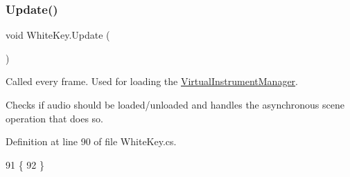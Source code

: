 \mbox{\label{group___white_key_unity_ga160cb397de3ab7084247e7fede943cf7}} 
\subsubsection{\texorpdfstring{Update()}{Update()}}
{\footnotesize\ttfamily void White\+Key.\+Update (\begin{DoxyParamCaption}{ }\end{DoxyParamCaption})\hspace{0.3cm}{\ttfamily [private]}}



Called every frame. Used for loading the \hyperlink{class_virtual_instrument_manager}{Virtual\+Instrument\+Manager}. 

Checks if audio should be loaded/unloaded and handles the asynchronous scene operation that does so. 

Definition at line 90 of file White\+Key.\+cs.


\begin{DoxyCode}
91     \{
92     \}
\end{DoxyCode}
